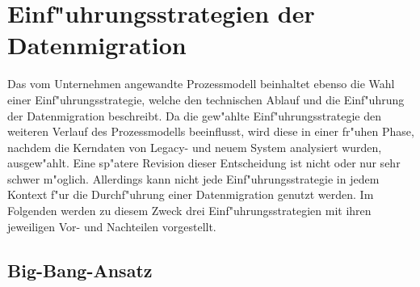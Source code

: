 \section{Einf"uhrungsstrategien der Datenmigration}
\label{chapter:vorgehensweisen}


Das vom Unternehmen angewandte Prozessmodell beinhaltet ebenso die Wahl einer Einf"uhrungsstrategie, welche den technischen Ablauf und die Einf"uhrung der Datenmigration beschreibt. Da die gew"ahlte Einf"uhrungsstrategie den weiteren Verlauf des Prozessmodells beeinflusst, wird diese in einer fr"uhen Phase, nachdem die Kerndaten von Legacy- und neuem System analysiert wurden, ausgew"ahlt. Eine sp"atere Revision dieser Entscheidung ist nicht oder nur sehr schwer m"oglich. Allerdings kann nicht jede Einf"uhrungsstrategie in jedem Kontext f"ur die Durchf"uhrung einer Datenmigration genutzt werden. Im Folgenden werden zu diesem Zweck drei Einf"uhrungsstrategien mit ihren jeweiligen Vor- und Nachteilen vorgestellt. 

\subsection{Big-Bang-Ansatz}

